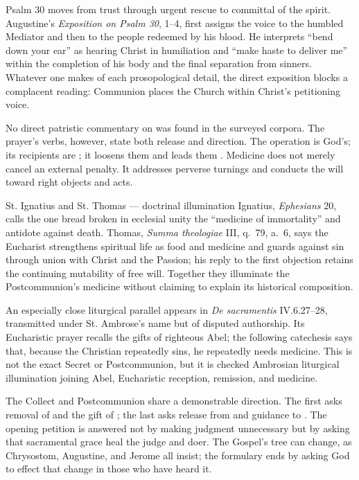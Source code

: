 \begin{deepstudy}
Psalm 30 moves from trust through urgent rescue to committal of the spirit. Augustine's \emph{Exposition on Psalm 30}, 1--4, first assigns the voice to the humbled Mediator and then to the people redeemed by his blood. He interprets ``bend down your ear'' as hearing Christ in humiliation and ``make haste to deliver me'' within the completion of his body and the final separation from sinners. Whatever one makes of each prosopological detail, the direct exposition blocks a complacent reading: Communion places the Church within Christ's petitioning voice.

No direct patristic commentary on  was found in the surveyed corpora. The prayer's verbs, however, state both release and direction. The operation is God's; its recipients are ; it loosens them  and leads them . Medicine does not merely cancel an external penalty. It addresses perverse turnings and conducts the will toward right objects and acts.

\begin{sourcecard}{St. Ignatius and St. Thomas --- doctrinal illumination}
Ignatius, \emph{Ephesians} 20, calls the one bread broken in ecclesial unity the ``medicine of immortality'' and antidote against death. Thomas, \emph{Summa theologiae} III, q.~79, a.~6, says the Eucharist strengthens spiritual life as food and medicine and guards against sin through union with Christ and the Passion; his reply to the first objection retains the continuing mutability of free will. Together they illuminate the Postcommunion's medicine without claiming to explain its historical composition.
\end{sourcecard}

An especially close liturgical parallel appears in \emph{De sacramentis} IV.6.27--28, transmitted under St. Ambrose's name but of disputed authorship. Its Eucharistic prayer recalls the gifts of righteous Abel; the following catechesis says that, because the Christian repeatedly sins, he repeatedly needs medicine. This is not the exact Secret or Postcommunion, but it is checked Ambrosian liturgical illumination joining Abel, Eucharistic reception, remission, and medicine.

The Collect and Postcommunion share a demonstrable direction. The first asks removal of  and the gift of ; the last asks release from  and guidance to . The opening petition is answered not by making judgment unnecessary but by asking that sacramental grace heal the judge and doer. The Gospel's tree can change, as Chrysostom, Augustine, and Jerome all insist; the formulary ends by asking God to effect that change in those who have heard it.


\end{deepstudy}
